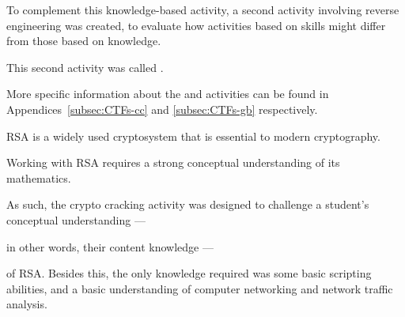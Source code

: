 To complement this knowledge-based activity, a second activity involving reverse engineering was created, to evaluate how activities based on skills might differ from those based on knowledge. %







This second activity was called . %







More specific information about the  and  activities can be found in Appendices~\ref{subsec:CTFs-cc} and \ref{subsec:CTFs-gb} respectively.






















    RSA is a widely used cryptosystem that is essential to modern cryptography. %







Working with RSA requires a strong conceptual understanding of its mathematics. %







As such, the crypto cracking activity was designed to challenge a student's conceptual understanding ---%







 in other words, their content knowledge ---%







 of RSA. Besides this, the only knowledge required was some basic scripting abilities, and a basic understanding of computer networking and network traffic analysis. %







